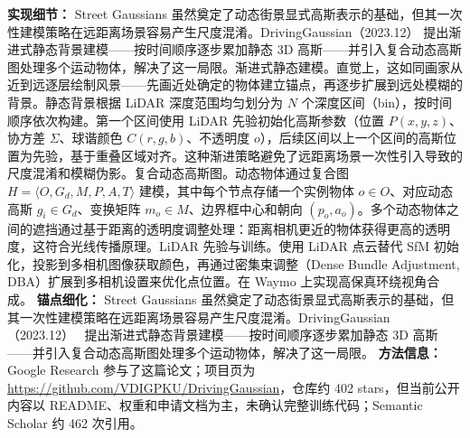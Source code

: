 \textbf{实现细节：} Street Gaussians 虽然奠定了动态街景显式高斯表示的基础，但其一次性建模策略在远距离场景容易产生尺度混淆。DrivingGaussian（2023.12） 提出渐进式静态背景建模——按时间顺序逐步累加静态 3D 高斯——并引入复合动态高斯图处理多个运动物体，解决了这一局限。渐进式静态建模。直觉上，这如同画家从近到远逐层绘制风景——先画近处确定的物体建立锚点，再逐步扩展到远处模糊的背景。静态背景根据 LiDAR 深度范围均匀划分为 $N$ 个深度区间（bin），按时间顺序依次构建。第一个区间使用 LiDAR 先验初始化高斯参数（位置 $P(x,y,z)$、协方差 $\Sigma$、球谐颜色 $C(r,g,b)$、不透明度 $o$），后续区间以上一个区间的高斯位置为先验，基于重叠区域对齐。这种渐进策略避免了远距离场景一次性引入导致的尺度混淆和模糊伪影。复合动态高斯图。动态物体通过复合图 $H = \langle O, G_d, M, P, A, T \rangle$ 建模，其中每个节点存储一个实例物体 $o \in O$、对应动态高斯 $g_i \in G_d$、变换矩阵 $m_o \in M$、边界框中心和朝向 $(p_o, a_o)$。多个动态物体之间的遮挡通过基于距离的透明度调整处理：距离相机更近的物体获得更高的透明度，这符合光线传播原理。LiDAR 先验与训练。使用 LiDAR 点云替代 SfM 初始化，投影到多相机图像获取颜色，再通过密集束调整（Dense Bundle Adjustment, DBA）扩展到多相机设置来优化点位置。在 Waymo 上实现高保真环绕视角合成。
\textbf{锚点细化：} Street Gaussians 虽然奠定了动态街景显式高斯表示的基础，但其一次性建模策略在远距离场景容易产生尺度混淆。DrivingGaussian（2023.12）~\cite{2312_07920} 提出渐进式静态背景建模——按时间顺序逐步累加静态 3D 高斯——并引入复合动态高斯图处理多个运动物体，解决了这一局限。
\textbf{方法信息：} Google Research 参与了这篇论文；项目页为 \url{https://github.com/VDIGPKU/DrivingGaussian}，仓库约 402 stars，但当前公开内容以 README、权重和申请文档为主，未确认完整训练代码；Semantic Scholar 约 462 次引用。



